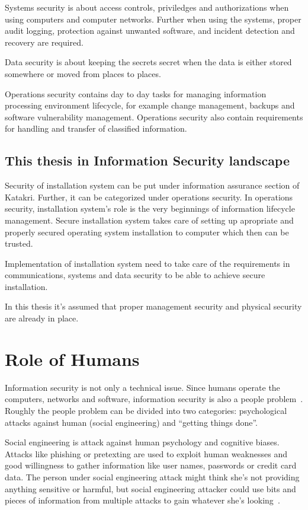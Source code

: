 Systems security is about access controls, priviledges and
authorizations when using computers and computer networks. Further
when using the systems, proper audit logging, protection against
unwanted software, and incident detection and recovery are required.

Data security is about keeping the secrets secret when the data is
either stored somewhere or moved from places to places.

Operations security contains day to day tasks for managing information
processing environment lifecycle, for example change management,
backups and software vulnerability management. Operations security
also contain requirements for handling and transfer of classified
information.


\subsection{This thesis in Information Security landscape}

Security of installation system can be put under information assurance
section of Katakri. Further, it can be categorized under operations
security. In operations security, installation system's role is the
very beginnings of information lifecycle management. Secure
installation system takes care of setting up apropriate and properly
secured operating system installation to computer which then can be
trusted.

Implementation of installation system need to take care of the
requirements in communications, systems and data security to be able
to achieve secure installation.

In this thesis it's assumed that proper management security and
physical security are already in place.


\section{Role of Humans}

Information security is not only a technical issue. Since humans
operate the computers, networks and software, information security is
also a people problem~\cite{parsons2010human}\cite{anderson}. Roughly
the people problem can be divided into two categories: psychological
attacks against human (social engineering) and ``getting things
done''.

Social engineering is attack against human psychology and cognitive
biases. Attacks like phishing or pretexting are used to exploit human
weaknesses and good willingness to gather information like user names,
passwords or credit card data. The person under social engineering
attack might think she's not providing anything sensitive or harmful,
but social engineering attacker could use bits and pieces of
information from multiple attacks to gain whatever she's
looking~\cite{greavu2014social}\cite{anderson}.


